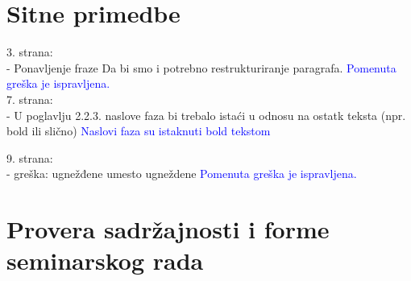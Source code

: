 \documentclass[a4paper]{report}
\newcommand{\odgovor}[1]{\textcolor{blue}{#1}}
\begin{document}
\section{Sitne primedbe}
3. strana:\\
-  Ponavljenje fraze Da bi smo i potrebno restrukturiranje paragrafa. 
\odgovor {Pomenuta greška je ispravljena.}\\
7. strana:\\
- U poglavlju 2.2.3. naslove faza bi trebalo istaći u odnosu na ostatk teksta (npr. bold ili slično)
\odgovor {Naslovi faza su istaknuti bold tekstom}

9. strana:\\
- greška: ugnežđene umesto ugneždene
\odgovor {Pomenuta greška je ispravljena.}


\section{Provera sadržajnosti i forme seminarskog rada}
\end{document}
